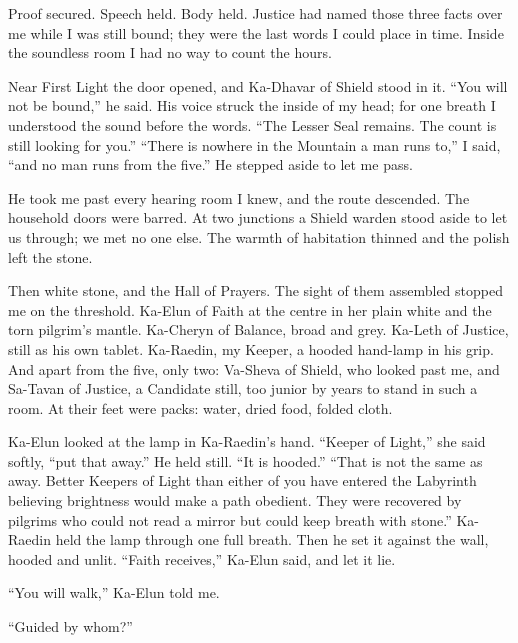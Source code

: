 
Proof secured. Speech held. Body held. Justice had named those three facts over me while I was still bound; they were the last words I could place in time. Inside the soundless room I had no way to count the hours.\par

Near First Light the door opened, and Ka-Dhavar of Shield stood in it. ``You will not be bound,'' he said. His voice struck the inside of my head; for one breath I understood the sound before the words. ``The Lesser Seal remains. The count is still looking for you.'' ``There is nowhere in the Mountain a man runs to,'' I said, ``and no man runs from the five.'' He stepped aside to let me pass.\par

He took me past every hearing room I knew, and the route descended. The household doors were barred. At two junctions a Shield warden stood aside to let us through; we met no one else. The warmth of habitation thinned and the polish left the stone.\par

Then white stone, and the Hall of Prayers. The sight of them assembled stopped me on the threshold. Ka-Elun of Faith at the centre in her plain white and the torn pilgrim's mantle. Ka-Cheryn of Balance, broad and grey. Ka-Leth of Justice, still as his own tablet. Ka-Raedin, my Keeper, a hooded hand-lamp in his grip. And apart from the five, only two: Va-Sheva of Shield, who looked past me, and Sa-Tavan of Justice, a Candidate still, too junior by years to stand in such a room. At their feet were packs: water, dried food, folded cloth.\par

Ka-Elun looked at the lamp in Ka-Raedin's hand. ``Keeper of Light,'' she said softly, ``put that away.'' He held still. ``It is hooded.'' ``That is not the same as away. Better Keepers of Light than either of you have entered the Labyrinth believing brightness would make a path obedient. They were recovered by pilgrims who could not read a mirror but could keep breath with stone.'' Ka-Raedin held the lamp through one full breath. Then he set it against the wall, hooded and unlit. ``Faith receives,'' Ka-Elun said, and let it lie.\par

``You will walk,'' Ka-Elun told me.\par

``Guided by whom?''\par

